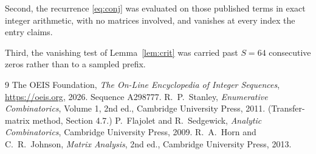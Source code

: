 \documentclass[11pt,a4paper]{article}
\theoremstyle{plain}
\theoremstyle{definition}
\begin{document}
Second, the recurrence \eqref{eq:conj} was evaluated on those published terms in exact
integer arithmetic, with no matrices involved, and vanishes at every index the entry claims.

Third, the vanishing test of Lemma~\ref{lem:crit} was carried past $S=64$ consecutive
zeros rather than to a sampled prefix.

\begin{thebibliography}{9}
 The OEIS Foundation, \emph{The On-Line Encyclopedia of Integer
Sequences}, \url{https://oeis.org}, 2026. Sequence A298777.
 R.~P.~Stanley, \emph{Enumerative Combinatorics}, Volume 1, 2nd ed.,
Cambridge University Press, 2011. (Transfer-matrix method, Section 4.7.)
 P.~Flajolet and R.~Sedgewick, \emph{Analytic Combinatorics}, Cambridge
University Press, 2009.
 R.~A.~Horn and C.~R.~Johnson, \emph{Matrix Analysis}, 2nd ed., Cambridge
University Press, 2013.
\end{thebibliography}
\end{document}

